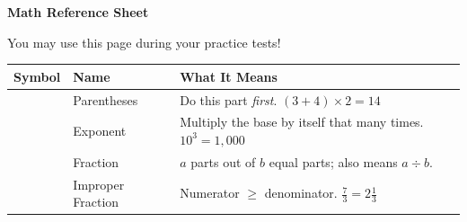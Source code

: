 
\thispagestyle{empty}

{
\sffamily

\begin{tcolorbox}[
    enhanced,
    colback=funBlue!85,
    colframe=funBlue!85,
    arc=0pt,
    boxrule=0pt,
    left=5mm, right=5mm, top=4mm, bottom=4mm,
    halign=center,
]
    {\fontsize{22}{26}\selectfont\bfseries\color{white}
    \faRulerCombined\quad Math Reference Sheet}

    \smallskip
    {\normalsize\color{white!80} You may use this page during your practice tests!}
\end{tcolorbox}

\vspace{2mm}

\begin{center}
\renewcommand{\arraystretch}{1.7}
\begin{tabular}{
    >{\centering\arraybackslash}m{2cm}
    >{\raggedright\arraybackslash}m{3cm}
    >{\raggedright\arraybackslash}m{8.5cm}
}
\toprule
\textbf{\textcolor{funBlueDark}{Symbol}} &
\textbf{\textcolor{funBlueDark}{Name}} &
\textbf{\textcolor{funBlueDark}{What It Means}} \\
\midrule

{\fontsize{20}{22}\selectfont\textcolor{funBlue}{$( \ )$}} &
Parentheses &
Do this part \textit{first}. \hfill $(3 + 4) \times 2 = 14$ \\

{\fontsize{20}{22}\selectfont\textcolor{funGreen}{$10^{3}$}} &
Exponent &
Multiply the base by itself that many times. \hfill $10^{3} = 1{,}000$ \\

{\fontsize{20}{22}\selectfont\textcolor{funPurple}{$\frac{a}{b}$}} &
Fraction &
$a$ parts out of $b$ equal parts; also means $a \div b$. \\

{\fontsize{20}{22}\selectfont\textcolor{funOrange}{$\frac{7}{3}$}} &
Improper Fraction &
Numerator $\ge$ denominator. \hfill $\frac{7}{3} = 2\frac{1}{3}$ \\


\end{tabular}
\end{center}}
